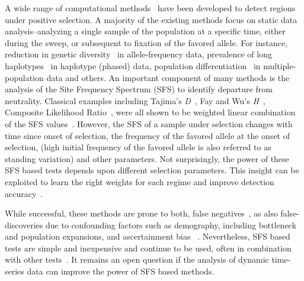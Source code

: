 \documentclass[11pt]{article}
\begin{document}
A wide range of computational methods~\cite{vitti2013detecting} have
been developed to detect regions under positive selection. A majority
of the existing methods focus on static data analysis--analyzing a
single sample of the population at a specific time, either during the
sweep, or subsequent to fixation of the favored allele. For instance,
reduction in genetic
diversity~\cite{tajima1989statistical,fay2000hitchhiking,ronen2013learning}
in allele-frequency data, prevalence of long
haplotypes~\cite{sabeti2006positive,vitti2013detecting} in haplotype
(phased) data, population
differentiation~\cite{holsinger2009genetics,burke2010genome} in
multiple-population data and others. An important component of many
methods is the analysis of the Site Frequency Spectrum (SFS) to
identify departure from neutrality. Classical examples including
Tajima's \emph{D}~\cite{tajima1989statistical}, Fay and Wu's
\emph{H}~\cite{fay2000hitchhiking}, Composite Likelihood
Ratio~\cite{nielsen2005genomic}, were all shown to be weighted linear
combination of the SFS values~\cite{achaz2009frequency}. However, the
SFS of a sample under selection changes with time since onset of
selection, the frequency of the favored allele at the onset of
selection, (high initial frequency of the favored allele is also
referred to as standing variation) and other parameters. Not
surprisingly, the power of these SFS based tests depends upon
different selection parameters. This insight can be exploited to learn
the right weights for each regime and improve detection
accuracy~\cite{ronen2013learning}.

While successful, these methods are prone to both, false
negatives~\cite{messer2013population}, as also false-discoveries due
to confounding factors such as demography, including bottleneck and
population expansions, and ascertainment bias ~\cite{ptak2002evidence,
  ramos2002statistical,akey2009constructing,
  nielsen2003correcting,messer2013population}. Nevertheless, SFS based
tests are simple and inexpensive and continue to be used, often in
combination with other
tests~\cite{akey2009constructing,vitti2013detecting}. It remains an
open question if the analysis of dynamic time-series data can improve
the power of SFS based methods.
\end{document}
